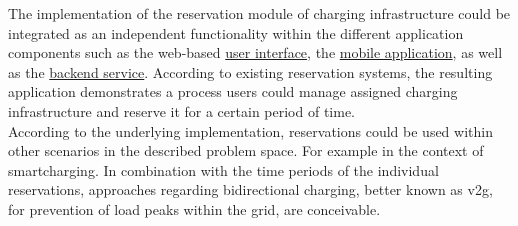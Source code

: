 The implementation of the reservation module of charging infrastructure could be integrated as an independent functionality within the different application components such as the web-based \href{https://github.com/JulianHBuecher/ev-dashboard}{user interface}, the \href{https://github.com/JulianHBuecher/ev-mobile}{mobile application}, as well as the \href{https://github.com/JulianHBuecher/ev-server}{backend service}. According to existing reservation systems, the resulting application demonstrates a process users could manage assigned charging infrastructure and reserve it for a certain period of time.\\
According to the underlying implementation, reservations could be used within other scenarios in the described problem space. For example in the context of \gls{smartcharging}. In combination with the time periods of the individual reservations, approaches regarding bidirectional charging, better known as \acrfull{v2g}, for prevention of load peaks within the grid, are conceivable.